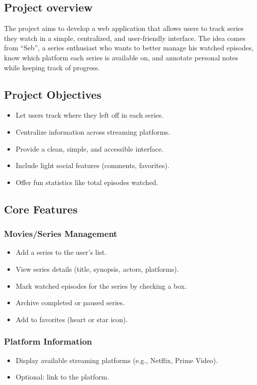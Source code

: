 \subsection{Project overview}
The project aims to develop a web application that allows users to track series they watch in a simple, centralized, and user-friendly interface. The idea comes from “Seb”, a series enthusiast who wants to better manage his watched episodes, know which platform each series is available on, and annotate personal notes while keeping track of progress.

\subsection{Project Objectives}
\begin{itemize}
    \item Let users track where they left off in each series.
    \item Centralize information across streaming platforms.
    \item Provide a clean, simple, and accessible interface.
    \item Include light social features (comments, favorites).
    \item Offer fun statistics like total episodes watched.
\end{itemize}

\subsection{Core Features}

\subsubsection{Movies/Series Management}
\begin{itemize}
    \item Add a series to the user's list.
    \item View series details (title, synopsis, actors, platforms).
    \item Mark watched episodes for the series by checking a box.
    \item Archive completed or paused series.
    \item Add to favorites (heart or star icon).
\end{itemize}

\subsubsection{Platform Information}
\begin{itemize}
    \item Display available streaming platforms (e.g., Netflix, Prime Video).
    \item Optional: link to the platform.
\end{itemize}

